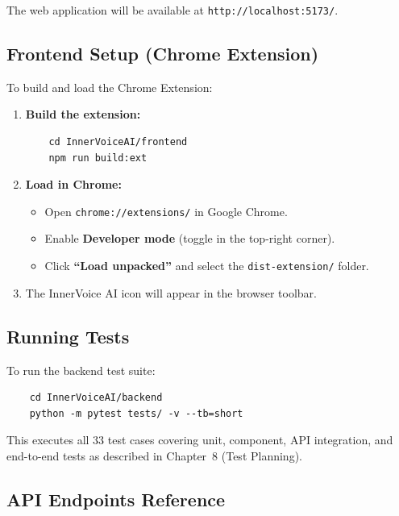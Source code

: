\documentclass[12pt,a4paper]{report}
\begin{document}
\begin{itemize}
\begin{enumerate}
    The web application will be available at \texttt{http://localhost:5173/}.
\end{enumerate}

\subsection{Frontend Setup (Chrome Extension)}

To build and load the Chrome Extension:

\begin{enumerate}
    \item \textbf{Build the extension:}
    \begin{verbatim}
    cd InnerVoiceAI/frontend
    npm run build:ext
    \end{verbatim}
    
    \item \textbf{Load in Chrome:}
    \begin{itemize}
        \item Open \texttt{chrome://extensions/} in Google Chrome.
        \item Enable \textbf{Developer mode} (toggle in the top-right corner).
        \item Click \textbf{``Load unpacked''} and select the \texttt{dist-extension/} folder.
    \end{itemize}
    
    \item The InnerVoice AI icon will appear in the browser toolbar.
\end{enumerate}

\subsection{Running Tests}

To run the backend test suite:

\begin{verbatim}
    cd InnerVoiceAI/backend
    python -m pytest tests/ -v --tb=short
\end{verbatim}

This executes all 33 test cases covering unit, component, API integration, and end-to-end tests as described in Chapter~8 (Test Planning).

\subsection{API Endpoints Reference}


\end{itemize}
\end{document}
